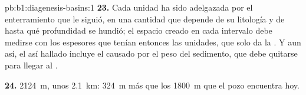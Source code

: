 \begin{solution}{pb:b1:diagenesis-basins:1}
\textbf{23.} Cada unidad ha sido adelgazada por el enterramiento que le siguió, en una cantidad que depende de su litología y de hasta qué profundidad se hundió; el espacio creado en cada
intervalo debe medirse con los espesores que tenían entonces las unidades, que solo da la . Y aun así, el  así hallado incluye el  causado por el peso del sedimento, que debe quitarse para llegar al
.

\textbf{24.} \qty{2124}{m}, unos \qty{2.1}{km}: \qty{324}{m} más que los \qty{1800}{m} que el pozo encuentra hoy.
\end{solution}
